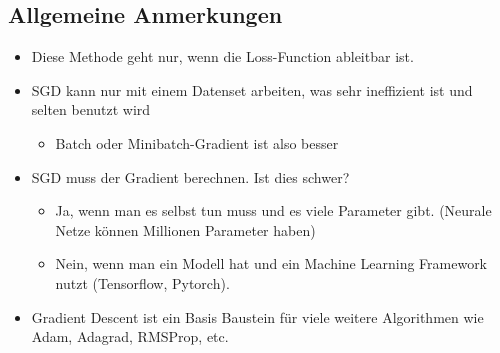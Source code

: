 \subsection{Allgemeine Anmerkungen}
\begin{itemize}
\item Diese Methode geht nur, wenn die Loss-Function ableitbar ist.
\item SGD kann nur mit einem Datenset arbeiten, was sehr ineffizient ist und selten benutzt wird
\begin{itemize}
\item Batch oder Minibatch-Gradient ist also besser
\end{itemize}
\item SGD muss der Gradient berechnen. Ist dies schwer?
\begin{itemize}
\item Ja, wenn man es selbst tun muss und es viele Parameter gibt. (Neurale Netze können Millionen Parameter haben)
\item Nein, wenn man ein Modell hat und ein Machine Learning Framework nutzt (Tensorflow, Pytorch).
\end{itemize}
\item Gradient Descent ist ein Basis Baustein für viele weitere Algorithmen wie Adam, Adagrad, RMSProp, etc.
\end{itemize}
